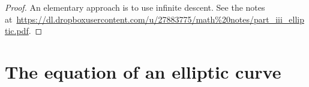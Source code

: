 \begin{proof}
An elementary approach is to use infinite descent. See the notes at~\url{https://dl.dropboxusercontent.com/u/27883775/math\%20notes/part_iii_elliptic.pdf}.
%
%
%
%
\end{proof}

\section{The equation of an elliptic curve}
